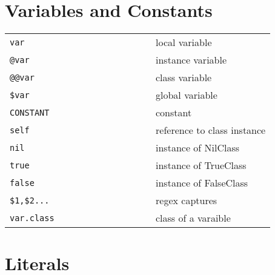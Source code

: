 \documentclass[6pt]{article}
\begin{document}
\begin{multicols}{3}
  \section{Variables and Constants}
  \begin{tabular}{L{0.55\linewidth} L{0.45\linewidth}}
    \tt var        & local variable              \\
    \tt @var       & instance variable           \\
    \tt @@var      & class variable              \\
    \tt \$var      & global variable             \\
    \tt CONSTANT   & constant                    \\
    \tt self       & reference to class instance \\
    \tt nil        & instance of NilClass        \\
    \tt true       & instance of TrueClass       \\
    \tt false      & instance of FalseClass      \\
    \tt \$1,\$2... & regex captures              \\
    \tt var.class  & class of a varaible         \\
  \end{tabular}

  \section{Literals}

\end{multicols}
\end{document}
